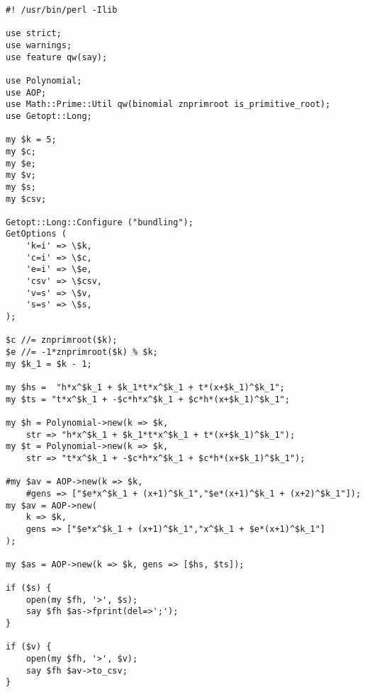 \documentclass[bibliography=totoc, a4paper, 12pt]{extarticle}
\begin{document}
\lstset{language=Perl}
\begin{verbatim}
#! /usr/bin/perl -Ilib

use strict;
use warnings;
use feature qw(say);

use Polynomial;
use AOP;
use Math::Prime::Util qw(binomial znprimroot is_primitive_root);
use Getopt::Long;

my $k = 5;
my $c;
my $e;
my $v;
my $s;
my $csv;

Getopt::Long::Configure ("bundling");
GetOptions (
    'k=i' => \$k,
    'c=i' => \$c,
    'e=i' => \$e,
    'csv' => \$csv,
    'v=s' => \$v,
    's=s' => \$s,
);

$c //= znprimroot($k);
$e //= -1*znprimroot($k) % $k;
my $k_1 = $k - 1;

my $hs =  "h*x^$k_1 + $k_1*t*x^$k_1 + t*(x+$k_1)^$k_1";
my $ts = "t*x^$k_1 + -$c*h*x^$k_1 + $c*h*(x+$k_1)^$k_1";

my $h = Polynomial->new(k => $k,
    str => "h*x^$k_1 + $k_1*t*x^$k_1 + t*(x+$k_1)^$k_1");
my $t = Polynomial->new(k => $k,
    str => "t*x^$k_1 + -$c*h*x^$k_1 + $c*h*(x+$k_1)^$k_1");

#my $av = AOP->new(k => $k,
    #gens => ["$e*x^$k_1 + (x+1)^$k_1","$e*(x+1)^$k_1 + (x+2)^$k_1"]);
my $av = AOP->new(
    k => $k,
    gens => ["$e*x^$k_1 + (x+1)^$k_1","x^$k_1 + $e*(x+1)^$k_1"]
);

my $as = AOP->new(k => $k, gens => [$hs, $ts]);

if ($s) {
    open(my $fh, '>', $s);
    say $fh $as->fprint(del=>';');
}

if ($v) {
    open(my $fh, '>', $v);
    say $fh $av->to_csv;
}
\end{verbatim}

\makeatletter
\renewcommand*{\@biblabel}[1]{\hfill#1.}
\makeatother
\end{document}
